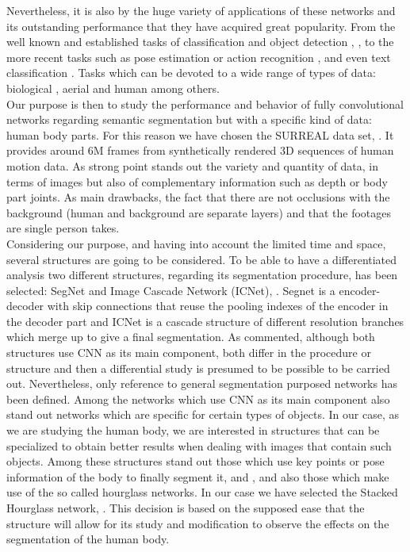 Nevertheless, it is also by the huge variety of applications of these networks and its outstanding performance that they have acquired great popularity. From the well known and established tasks of classification and object detection \parencite{Reference9}, \parencite{Reference10}, to the more recent tasks such as pose estimation \parencite{Reference11} or action recognition \parencite{Reference12}, and even text classification \parencite{Reference13}. Tasks which can be devoted to a wide range of types of data: biological \parencite{Reference14}, aerial \parencite{Reference15} and human \parencite{Reference16} among others.\\

Our purpose is then to study the performance and behavior of fully convolutional networks regarding semantic segmentation but with a specific kind of data: human body parts. For this reason we have chosen the SURREAL data set, \parencite{Reference17}. It provides around 6M frames from synthetically rendered 3D sequences of human motion data. As strong point stands out the variety and quantity of data, in terms of images but also of complementary information such as depth or body part joints. As main drawbacks, the fact that there are not occlusions with the background (human and background are separate layers) and that the footages are single person takes.\\

Considering our purpose, and having into account the limited time and space, several structures are going to be considered. To be able to have a differentiated analysis two different structures, regarding its segmentation procedure, has been selected: SegNet and Image Cascade Network (ICNet), \parencite{Reference18}. Segnet is a encoder-decoder with skip connections that reuse the pooling indexes of the encoder in the decoder part and ICNet is a cascade structure of different resolution branches which merge up to give a final segmentation. As commented, although both structures use CNN as its main component, both differ in the procedure or structure and then a differential study is presumed to be possible to be carried out. Nevertheless, only reference to general segmentation purposed networks has been defined. Among the networks which use CNN as its main component also stand out networks which are specific for certain types of objects. In our case, as we are studying the human body, we are interested in structures that can be specialized to obtain better results when dealing with images that contain such objects. Among these structures  stand out those which use key points or pose information of the body to finally segment it, \parencite{Reference19} and \parencite{Reference20}, and also those which make use of the so called hourglass networks. In our case we have selected the Stacked Hourglass network, \parencite{Reference21}. This decision is based on the supposed ease that the structure will allow for its study and modification to observe the effects on the segmentation of the human body.\newline

